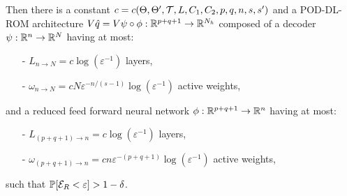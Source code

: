 \begin{theorem}
\begin{equation*}
    \end{equation*}
    Then there is a constant $c = c(\Theta, \Theta', \mathcal{T}, L, C_1, C_2, p, q, n, s, s')$ and a POD-DL-ROM architecture $V \hat{q} =
    V \psi \circ \phi: \mathbb{R}^{p+q+1} \to \mathbb{R}^{N_h}$ composed of a decoder $\psi: \mathbb{R}^n \to \mathbb{R}^N$ having at most:
    \begin{enumerate}
        \item[-] $L_{n \to N} = c \log(\varepsilon^{-1})$ layers,
        \item[-] $\omega_{n \to N} = cN \varepsilon^{-n/(s-1)} \log(\varepsilon^{-1})$ active weights,
    \end{enumerate}
    and a reduced feed forward neural network $\phi: \mathbb{R}^{p+q+1} \to \mathbb{R}^n$ having at most:
    \begin{enumerate}
        \item[-] $L_{(p+q+1) \to n} = c \log(\varepsilon^{-1})$ layers,
        \item[-] $\omega_{(p+q+1) \to n} = cn \varepsilon^{-(p+q+1)} \log(\varepsilon^{-1})$ active weights,
    \end{enumerate}
    such that $\mathbb{P}[\mathcal{E}_R < \varepsilon] > 1 - \delta$.
\end{theorem}

